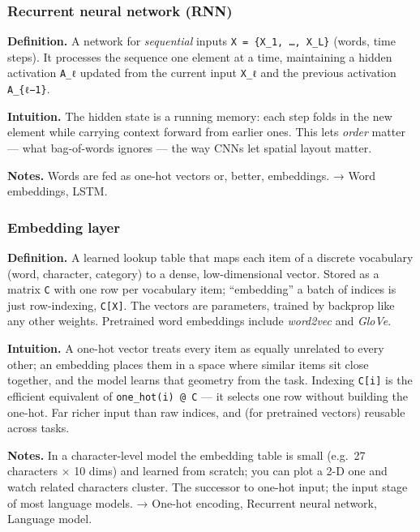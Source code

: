 \documentclass[
  10pt,
  letterpaper,
  onecolumn]{article}
\begin{document}
\hypertarget{recurrent-neural-network-rnn}{%
\subsubsection{Recurrent neural network
(RNN)}\label{recurrent-neural-network-rnn}}

\textbf{Definition.} A network for \emph{sequential} inputs
\texttt{X\ =\ \{X\_1,\ …,\ X\_L\}} (words, time steps). It processes the
sequence one element at a time, maintaining a hidden activation
\texttt{A\_ℓ} updated from the current input \texttt{X\_ℓ} and the
previous activation \texttt{A\_\{ℓ−1\}}.

\textbf{Intuition.} The hidden state is a running memory: each step
folds in the new element while carrying context forward from earlier
ones. This lets \emph{order} matter --- what bag-of-words ignores ---
the way CNNs let spatial layout matter.

\textbf{Notes.} Words are fed as one-hot vectors or, better, embeddings.
→ Word embeddings, LSTM.

\hypertarget{embedding-layer}{%
\subsubsection{Embedding layer}\label{embedding-layer}}

\textbf{Definition.} A learned lookup table that maps each item of a
discrete vocabulary (word, character, category) to a dense,
low-dimensional vector. Stored as a matrix \texttt{C} with one row per
vocabulary item; ``embedding'' a batch of indices is just row-indexing,
\texttt{C{[}X{]}}. The vectors are parameters, trained by backprop like
any other weights. Pretrained word embeddings include \emph{word2vec}
and \emph{GloVe}.

\textbf{Intuition.} A one-hot vector treats every item as equally
unrelated to every other; an embedding places them in a space where
similar items sit close together, and the model learns that geometry
from the task. Indexing \texttt{C{[}i{]}} is the efficient equivalent of
\texttt{one\_hot(i)\ @\ C} --- it selects one row without building the
one-hot. Far richer input than raw indices, and (for pretrained vectors)
reusable across tasks.

\textbf{Notes.} In a character-level model the embedding table is small
(e.g.~27 characters × 10 dims) and learned from scratch; you can plot a
2-D one and watch related characters cluster. The successor to one-hot
input; the input stage of most language models. → One-hot encoding,
Recurrent neural network, Language model.
\end{document}
